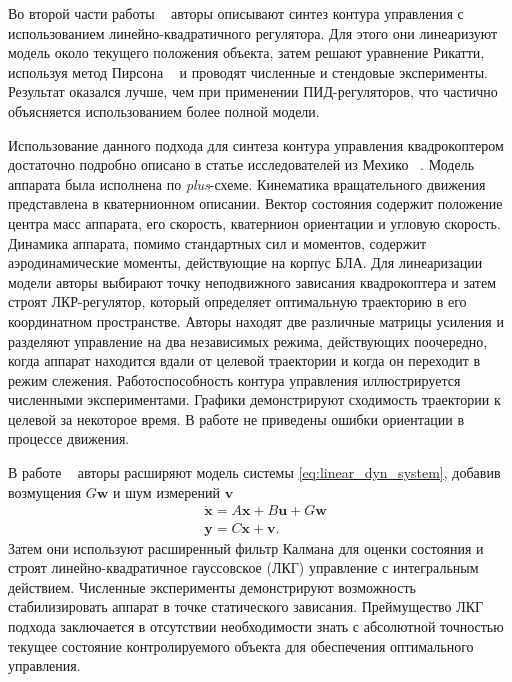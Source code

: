 \documentclass[a4paper,14pt,oneside,openany]{memoir}
\begin{document}
	
	Во второй части работы ~\cite{Bouabdallah01} авторы описывают синтез контура управления с использованием линейно-квадратичного регулятора. Для этого они линеаризуют модель около текущего положения объекта, затем решают уравнение Рикатти, используя метод Пирсона ~\cite{Longchamp01} и проводят численные и стендовые эксперименты. Результат оказался лучше, чем при применении ПИД-регуляторов, что частично объясняется использованием более полной модели.
	
	
	Использование данного подхода для синтеза контура управления квадрокоптером достаточно подробно описано в статье исследователей из Мехико ~\cite{Reyes-Valeria01}. Модель аппарата была исполнена по \textit{plus}-схеме. Кинематика вращательного движения представлена в кватернионном описании. Вектор состояния содержит положение центра масс аппарата, его скорость, кватернион ориентации и угловую скорость. Динамика аппарата, помимо стандартных сил и моментов, содержит аэродинамические моменты, действующие на корпус БЛА. Для линеаризации модели авторы выбирают точку неподвижного зависания квадрокоптера и затем строят ЛКР-регулятор, который определяет оптимальную траекторию в его координатном пространстве. Авторы находят две различные матрицы усиления и разделяют управление на два независимых режима, действующих поочередно, когда аппарат находится вдали от целевой траектории и когда он переходит в режим слежения. Работоспособность контура управления иллюстрируется численными экспериментами. Графики демонстрируют сходимость траектории к целевой за некоторое время. В работе не приведены ошибки ориентации в процессе движения.
	
	В работе ~\cite{Minh01} авторы расширяют модель системы \eqref{eq:linear_dyn_system}, добавив возмущения $G \bm{w}$ и шум измерений $\bm{v}$
	\begin{equation} \label{eq:linear_dyn_system_noisy}
	\begin{aligned}
	&\dot{\bm{x}} = A\bm{x} + B\bm{u} + G \bm{w}\\
	&\bm{y} = C \bm{x} + \bm{v}.
	\end{aligned}
	\end{equation}
	Затем они используют расширенный фильтр Калмана для оценки состояния и строят линейно-квадратичное гауссовское (ЛКГ) управление с интегральным действием. Численные эксперименты демонстрируют возможность стабилизировать аппарат в точке статического зависания. Преймущество ЛКГ подхода заключается в отсутствии необходимости знать с абсолютной точностью текущее состояние контролируемого объекта для обеспечения оптимального управления.
	
\end{document}
